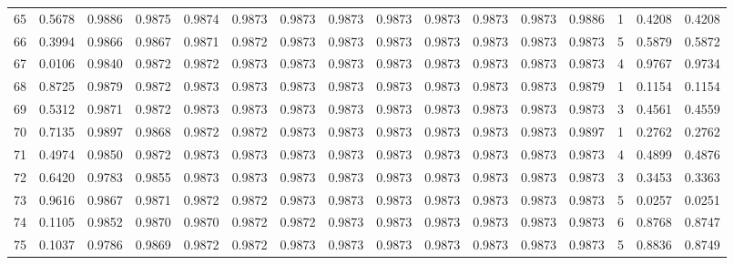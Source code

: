 \begin{tabular}{lrrrrrrrrrrrrrrr}
65  &      0.5678 &  0.9886 &  0.9875 &  0.9874 &  0.9873 &  0.9873 &  0.9873 &  0.9873 &  0.9873 &  0.9873 &   0.9873 &     0.9886 &      1 &                    0.4208 &                     0.4208 \\
66  &      0.3994 &  0.9866 &  0.9867 &  0.9871 &  0.9872 &  0.9873 &  0.9873 &  0.9873 &  0.9873 &  0.9873 &   0.9873 &     0.9873 &      5 &                    0.5879 &                     0.5872 \\
67  &      0.0106 &  0.9840 &  0.9872 &  0.9872 &  0.9873 &  0.9873 &  0.9873 &  0.9873 &  0.9873 &  0.9873 &   0.9873 &     0.9873 &      4 &                    0.9767 &                     0.9734 \\
68  &      0.8725 &  0.9879 &  0.9872 &  0.9873 &  0.9873 &  0.9873 &  0.9873 &  0.9873 &  0.9873 &  0.9873 &   0.9873 &     0.9879 &      1 &                    0.1154 &                     0.1154 \\
69  &      0.5312 &  0.9871 &  0.9872 &  0.9873 &  0.9873 &  0.9873 &  0.9873 &  0.9873 &  0.9873 &  0.9873 &   0.9873 &     0.9873 &      3 &                    0.4561 &                     0.4559 \\
70  &      0.7135 &  0.9897 &  0.9868 &  0.9872 &  0.9872 &  0.9873 &  0.9873 &  0.9873 &  0.9873 &  0.9873 &   0.9873 &     0.9897 &      1 &                    0.2762 &                     0.2762 \\
71  &      0.4974 &  0.9850 &  0.9872 &  0.9873 &  0.9873 &  0.9873 &  0.9873 &  0.9873 &  0.9873 &  0.9873 &   0.9873 &     0.9873 &      4 &                    0.4899 &                     0.4876 \\
72  &      0.6420 &  0.9783 &  0.9855 &  0.9873 &  0.9873 &  0.9873 &  0.9873 &  0.9873 &  0.9873 &  0.9873 &   0.9873 &     0.9873 &      3 &                    0.3453 &                     0.3363 \\
73  &      0.9616 &  0.9867 &  0.9871 &  0.9872 &  0.9872 &  0.9873 &  0.9873 &  0.9873 &  0.9873 &  0.9873 &   0.9873 &     0.9873 &      5 &                    0.0257 &                     0.0251 \\
74  &      0.1105 &  0.9852 &  0.9870 &  0.9870 &  0.9872 &  0.9872 &  0.9873 &  0.9873 &  0.9873 &  0.9873 &   0.9873 &     0.9873 &      6 &                    0.8768 &                     0.8747 \\
75  &      0.1037 &  0.9786 &  0.9869 &  0.9872 &  0.9872 &  0.9873 &  0.9873 &  0.9873 &  0.9873 &  0.9873 &   0.9873 &     0.9873 &      5 &                    0.8836 &                     0.8749 \\

\end{tabular}
